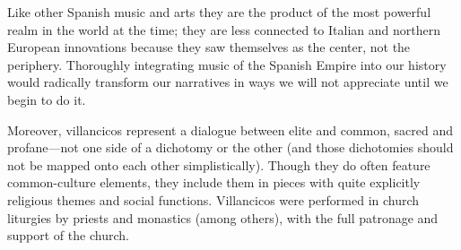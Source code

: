 Like other Spanish music and arts they are the product of the most powerful
realm in the world at the time; they are less connected to Italian and northern
European innovations because they saw themselves as the center, not the
periphery.  
Thoroughly integrating music of the Spanish Empire into our history would
radically transform our narratives in ways we will not appreciate until we
begin to do it.

Moreover, villancicos represent a dialogue between elite and common, sacred and
profane---not one side of a dichotomy or the other (and those dichotomies
should not be mapped onto each other simplistically).  
Though they do often feature common-culture elements, they include them in
pieces with quite explicitly religious themes and social functions.
Villancicos were performed in church liturgies by priests and monastics (among
others), with the full patronage and support of the church.

